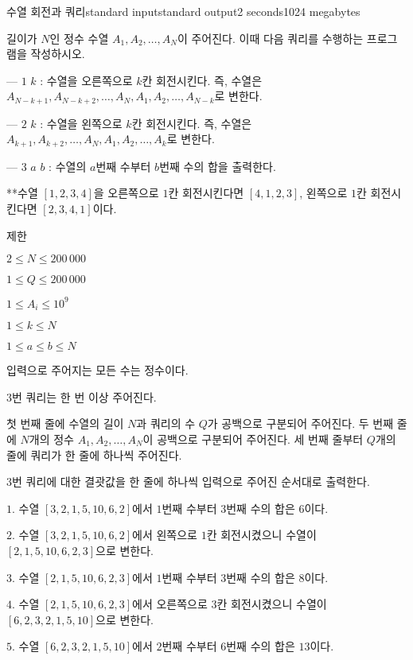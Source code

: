 \begin{problem}{수열 회전과 쿼리}{standard input}{standard output}{2 seconds}{1024 megabytes}

길이가 $N$인 정수 수열 $A_1,A_2,\dots,A_N$이 주어진다. 이때 다음 쿼리를 수행하는 프로그램을 작성하시오.

--- $1$ $k$ : 수열을 오른쪽으로 $k$칸 회전시킨다. 즉, 수열은 $A_{N-k+1},A_{N-k+2},\dots,A_N,A_1,A_2,\dots,A_{N-k}$로 변한다.

--- $2$ $k$ : 수열을 왼쪽으로 $k$칸 회전시킨다. 즉, 수열은 $A_{k+1},A_{k+2},\dots,A_N,A_1,A_2,\dots,A_{k}$로 변한다.

--- $3$ $a$ $b$ : 수열의 $a$번째 수부터 $b$번째 수의 합을 출력한다.

**수열 $[1,2,3,4]$을 오른쪽으로 $1$칸 회전시킨다면 $[4,1,2,3]$, 왼쪽으로 $1$칸 회전시킨다면 $[2,3,4,1]$이다.


제한

$2 \le N \le 200\,000$

$1 \le Q \le 200\,000$

$1 \le A_i \le 10^9$

$1 \le k \le N$

$1 \le a \le b \le N$

입력으로 주어지는 모든 수는 정수이다.

$3$번 쿼리는 한 번 이상 주어진다.

\InputFile
첫 번째 줄에 수열의 길이 $N$과 쿼리의 수 $Q$가 공백으로 구분되어 주어진다.
두 번째 줄에 $N$개의 정수 $A_1,A_2,\dots,A_N$이 공백으로 구분되어 주어진다.
세 번째 줄부터 $Q$개의 줄에 쿼리가 한 줄에 하나씩 주어진다.

\OutputFile
$3$번 쿼리에 대한 결괏값을 한 줄에 하나씩 입력으로 주어진 순서대로 출력한다.

\Example

\begin{example}
%
\end{example}

\Note
$1$. 수열 $[3,2,1,5,10,6,2]$에서 $1$번째 수부터 $3$번째 수의 합은 $6$이다.

$2$. 수열 $[3,2,1,5,10,6,2]$에서 왼쪽으로 $1$칸 회전시켰으니 수열이 $[2,1,5,10,6,2,3]$으로 변한다.

$3$. 수열 $[2,1,5,10,6,2,3]$에서 $1$번째 수부터 $3$번째 수의 합은 $8$이다.

$4$. 수열 $[2,1,5,10,6,2,3]$에서 오른쪽으로 $3$칸 회전시켰으니 수열이 $[6,2,3,2,1,5,10]$으로 변한다.

$5$. 수열 $[6,2,3,2,1,5,10]$에서 $2$번째 수부터 $6$번째 수의 합은 $13$이다.

\end{problem}

